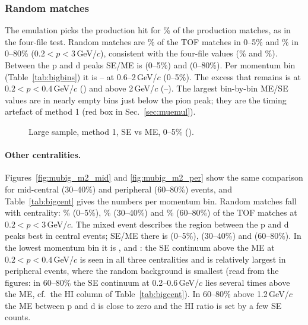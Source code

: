 \subsubsection{Random matches}
The emulation picks the production hit for \mubigChoiceSame\% of the production matches, as in the four-file test. Random
matches are \mubigFrProdCi\% of the TOF matches in 0--5\% and \mubigFrProdAll\% in 0--80\% ($0.2<p<3$\,GeV/$c$), consistent with the
four-file values (\muFrProdCi\% and \muFrProdAll\%). Between the p and d peaks SE/ME is \mubigHiProdCi{} (0--5\%) and
\mubigHiProdAll{} (0--80\%). Per momentum bin (Table~\ref{tab:bigbins}) it is \bigHiMidMin--\bigHiMidMax{} at 0.6--2\,GeV/$c$
(0--5\%). The excess that remains is at $0.2<p<0.4$\,GeV/$c$
(\bigHiLow) and above 2\,GeV/$c$ (\bigHiTopMin--\bigHiTopMax). The largest bin-by-bin ME/SE values are in nearly empty bins just
below the pion peak; they are the timing artefact of method 1 (red box in Sec.~\ref{sec:muemul}).

\begin{figure}[H]
\centering
{}
\caption{Large sample, method 1, SE vs ME, 0--5\% ().}
\end{figure}



\paragraph{Other centralities.} Figures~\ref{fig:mubig_m2_mid} and \ref{fig:mubig_m2_per} show the same comparison for mid-central
(30--40\%) and peripheral (60--80\%) events, and Table~\ref{tab:bigcent} gives the numbers per momentum bin. Random matches fall
with centrality: \mubigFrProdCi\% (0--5\%), \bigFrMid\% (30--40\%) and \bigFrPer\% (60--80\%) of the TOF matches at $0.2<p<3$\,GeV/$c$.
The mixed event describes the region between the p and d peaks best in central events; SE/ME there is \mubigHiProdCi{} (0--5\%),
\bigHiMid{} (30--40\%) and \bigHiPer{} (60--80\%). In the lowest momentum bin it is \bigHiLow, \bigHiLowMid{} and \bigHiLowPer: the
SE continuum above the ME at $0.2<p<0.4$\,GeV/$c$ is seen in all three centralities and is relatively largest in peripheral events,
where the random background is smallest (read from the figures: in 60--80\% the SE continuum at 0.2--0.6\,GeV/$c$ lies several times
above the ME, cf.\ the HI column of Table~\ref{tab:bigcent}). In 60--80\% above 1.2\,GeV/$c$ the ME between p and d is close to zero and the HI ratio is set by a
few SE counts.

